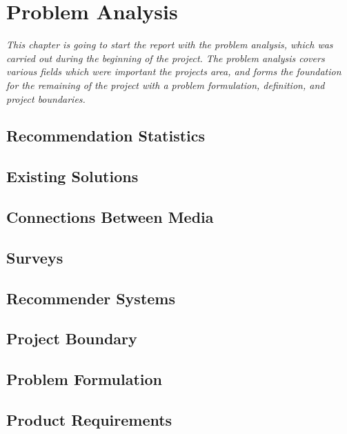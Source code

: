 \chapter{Problem Analysis}

\textit{This chapter is going to start the report with the problem analysis, which was carried out during the beginning of the project. The problem analysis covers various fields which were important the projects area, and forms the foundation for the remaining of the project with a problem formulation, definition, and project boundaries.}

\section{Recommendation Statistics}
\label{Statistics}

\section{Existing Solutions}
\label{Existing}

\section{Connections Between Media}
\label{Connections}

\section{Surveys}
\label{Surveys}

\section{Recommender Systems}
\label{RecommenderSystems}

\section{Project Boundary}
\label{Boundary}

\section{Problem Formulation}
\label{Formulation}

\section{Product Requirements}
\label{Requirements}
